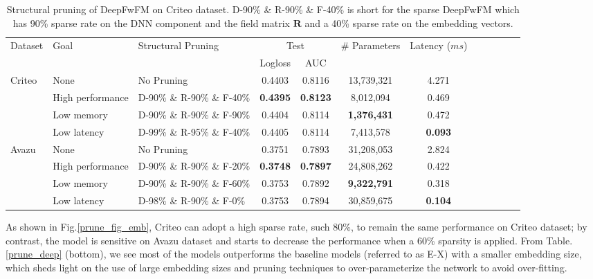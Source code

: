 \documentclass[sigconf]{acmart}
\begin{document}
\begin{table*}
 \caption{Structural pruning of DeepFwFM on Criteo dataset. D-90\% \& R-90\% \& F-40\% is short for the sparse DeepFwFM which has 90\% sparse rate on the DNN component and the field matrix $\bm{R}$ and a 40\% sparse rate on the embedding vectors.}
  \centering
  \small
  \begin{tabular}{lllccccccrrc}
    \toprule
    \multirow{2}{*}{Dataset}& \multirow{2}{*}{Goal}& \multirow{2}{*}{Structural Pruning}  &  \multicolumn{2}{c}{Test} & \multirow{2}{*}{\# Parameters} & \multirow{2}{*}{Latency ($ms$)}  \\
    & &   & Logloss     & AUC & \\
    \midrule
    \multirow{4}{*}{Criteo} & None & No Pruning   &  0.4403  & 0.8116 & 13,739,321 & 4.271 \\
     & High performance & D-90\% \& R-90\% \& F-40\% &  \textbf{0.4395}  & \textbf{{0.8123}}  & 8,012,094 & 0.469 \\
     & Low memory & D-90\% \& R-90\% \& F-90\% &   0.4404  & 0.8114  & \textbf{1,376,431} & 0.472 \\
     & {Low latency} & D-99\% \& R-95\% \& F-40\%  &  0.4405  & 0.8114  &   7,413,578 & \textbf{0.093} \\
    \midrule
    \multirow{4}{*}{Avazu} & None & No Pruning   &   0.3751 & 0.7893   & 31,208,053  & 2.824 \\
    & High performance & D-90\% \& R-90\% \& F-20\%  & \textbf{0.3748}  & \textbf{0.7897}   & 24,808,262  & 0.422  \\
     & Low memory & D-90\% \& R-90\% \& F-60\%  & 0.3753  & 0.7892   &  \textbf{9,322,791} & 0.318  \\
     & Low latency & D-98\% \& R-90\% \& F-0\%  &    0.3753 & 0.7894    & 30,859,675   & \textbf{0.104}
      \\
     \bottomrule
  \end{tabular}
  \label{prune_all_criteo}
\end{table*}

As shown in Fig.\ref{prune_fig_emb}, Criteo can adopt a high sparse rate, such 80\%, to remain the same performance on Criteo dataset; by contrast, the model is sensitive on Avazu dataset and starts to decrease the performance when a 60\% sparsity is applied. From Table. \ref{prune_deep} (bottom), we see most of the models outperforms the baseline models (referred to as E-X) with a smaller embedding size, which sheds light on the use of large embedding sizes and pruning techniques to over-parameterize the network to avoid over-fitting.
\end{document}
